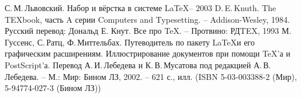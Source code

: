 \begin{thebibliography}{99}
	 С.\,М.\,Львовский. Набор и вёрстка в системе \LaTeX -- 2003
	 D.\,E.\,Knuth. The TEXbook, часть A серии Computers and Typesetting. -- Addison-Wesley, 1984. Русский перевод: Дональд Е. Кнут.
Все про \TeX. -- Протвино: РДTEX, 1993
	 М.\,Гуссенс, С.\,Ратц, Ф.\,Миттельбах. Путеводитель по пакету \LaTeX и его графическим расширениям. Иллюстрирование документов при помощи \TeX’а и PostScript’а. Перевод А.\,И.\,Лебедева и К.\,В.\,Мусатова под редакцией А.\,В.\,Лебедева. -- М.: Мир: Бином ЛЗ, 2002. -- 621 с., илл. (ISBN 5-03-003388-2 (Мир), 5-94774-027-3 (Бином ЛЗ))
\end{thebibliography}